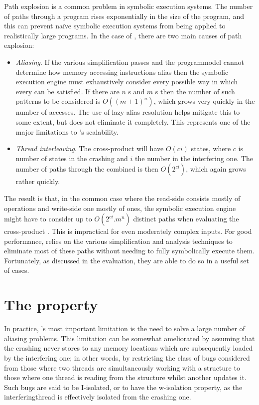Path explosion is a common problem in symbolic execution systems.  The
number of paths through a program rises exponentially in the size of
the program, and this can prevent na\"ive symbolic execution systems
from being applied to realistically large programs.  In the case of
\technique, there are two main causes of path explosion:
\begin{itemize}
\item
  \textit{Aliasing}.  If the various simplification passes and the
  \gls{programmodel} cannot determine how memory accessing
  instructions alias then the symbolic execution engine must
  exhaustively consider every possible way in which every 
  can be satisfied.  If there are $n$ s and $m$
  s then the number of such patterns to be considered is
  $O((m+1)^n)$, which grows very quickly in the number of accesses.
  The use of lazy alias resolution helps mitigate this to some extent,
  but does not eliminate it completely.  This represents one of the
  major limitations to \technique's scalability.
\item
  \textit{Thread interleaving}.  The cross-product {\StateMachine}
  will have $O(ci)$ states, where $c$ is number of states in the
  crashing {\StateMachine} and $i$ the number in the interfering one.
  The number of paths through the combined {\StateMachine} is then
  $O(2^{ci})$, which again grows rather quickly.
\end{itemize}
The result is that, in the common case where the read-side
{\StateMachine} consists mostly of  operations and
write-side one mostly of  ones, the symbolic execution
engine might have to consider up to $O(2^{ci}.m^n)$ distinct paths
when evaluating the cross-product {\StateMachine}.  This is
impractical for even moderately complex inputs.  For good performance,
{\technique} relies on the various simplification and analysis
techniques to eliminate most of these paths without needing to fully
symbolically execute them.  Fortunately, as discussed in the
evaluation, they are able to do so in a useful set of cases.

\section{The  property}
\label{sect:derive:w_isolation}

In practice, {\technique}'s most important limitation is the need to
solve a large number of aliasing problems.  This limitation can be
somewhat ameliorated by assuming that the crashing {\StateMachine}
never stores to any memory locations which are subsequently loaded by
the interfering one; in other words, by restricting the class of bugs
considered from those where two threads are simultaneously working
with a structure to those where one thread is reading from the
structure whilst another updates it.  Such bugs are said to be
I-isolated, or to have the \gls{w-isolation} property, as the
\gls{interferingthread} is effectively isolated from the crashing one.

